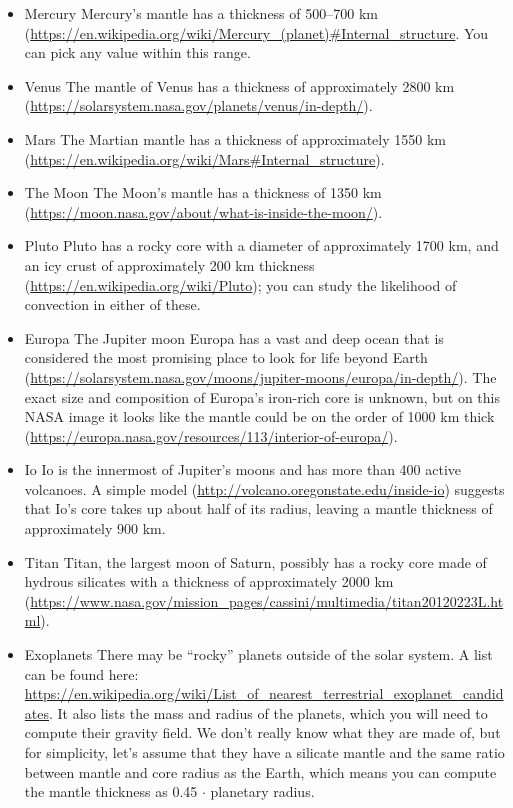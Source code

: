 \begin{itemize}
\item{Mercury} Mercury's mantle has a thickness of 500--700 km (\url{https://en.wikipedia.org/wiki/Mercury_(planet)#Internal_structure}. You can pick any value within this range. 

\item{Venus} The mantle of Venus has a thickness of approximately 2800 km (\url{https://solarsystem.nasa.gov/planets/venus/in-depth/}). 

\item{Mars} The Martian mantle has a thickness of approximately 1550 km (\url{https://en.wikipedia.org/wiki/Mars#Internal_structure}). 
 
\item{The Moon} The Moon's mantle has a thickness of 1350 km (\url{https://moon.nasa.gov/about/what-is-inside-the-moon/}). 
 
\item{Pluto} Pluto has a rocky core with a diameter of approximately 1700 km, and an icy crust of approximately 200 km thickness (\url{https://en.wikipedia.org/wiki/Pluto}); you can study the likelihood of convection in either of these. 

\item{Europa} The Jupiter moon Europa has a vast and deep ocean that is considered the most promising place to look for life beyond Earth (\url{https://solarsystem.nasa.gov/moons/jupiter-moons/europa/in-depth/}). The exact size and composition of Europa's iron-rich core is unknown, but on this NASA image it looks like the mantle could be on the order of 1000 km thick (\url{https://europa.nasa.gov/resources/113/interior-of-europa/}). 

\item{Io} Io is the innermost of Jupiter's moons and has more than 400 active volcanoes. A simple model (\url{http://volcano.oregonstate.edu/inside-io}) suggests that Io's core takes up about half of its radius, leaving a mantle thickness of approximately 900 km. 

\item{Titan} Titan, the largest moon of Saturn, possibly has a rocky core made of hydrous silicates with a thickness of approximately 2000 km (\url{https://www.nasa.gov/mission_pages/cassini/multimedia/titan20120223L.html}).

\item{Exoplanets} There may be ``rocky'' planets outside of the solar system. A list can be found here: \url{https://en.wikipedia.org/wiki/List_of_nearest_terrestrial_exoplanet_candidates}. It also lists the mass and radius of the planets, which you will need to compute their gravity field. We don't really know what they are made of, but for simplicity, let's assume that they have a silicate mantle and the same ratio between mantle and core radius as the Earth, which means you can compute the mantle thickness as 0.45 $\cdot$ planetary radius. 
\end{itemize}

